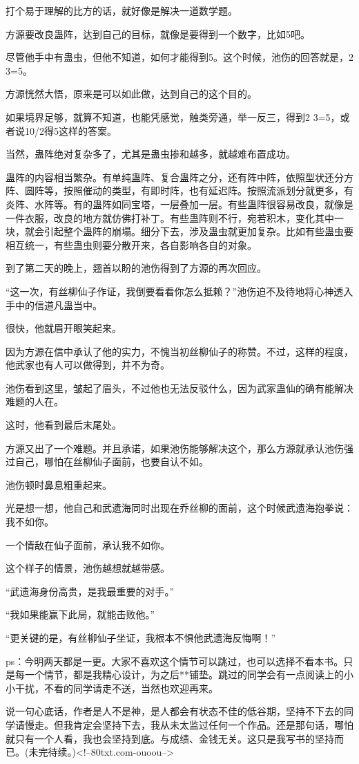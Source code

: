 \begin{this_body}
打个易于理解的比方的话，就好像是解决一道数学题。

方源要改良蛊阵，达到自己的目标，就像是要得到一个数字，比如5吧。

尽管他手中有蛊虫，但他不知道，如何才能得到5。这个时候，池伤的回答就是，2 3=5。

方源恍然大悟，原来是可以如此做，达到自己的这个目的。

如果境界足够，就算不知道，也能凭感觉，触类旁通，举一反三，得到2 3=5，或者说10/2得5这样的答案。

当然，蛊阵绝对复杂多了，尤其是蛊虫掺和越多，就越难布置成功。

蛊阵的内容相当繁杂。有单纯蛊阵、复合蛊阵之分，还有阵中阵，依照型状还分方阵、圆阵等，按照催动的类型，有即时阵，也有延迟阵。按照流派划分就更多，有炎阵、水阵等。有的蛊阵如同宝塔，一层叠加一层。有些蛊阵很容易改良，就像是一件衣服，改良的地方就仿佛打补丁。有些蛊阵则不行，宛若积木，变化其中一块，就会引起整个蛊阵的崩塌。细分下去，涉及蛊虫就更加复杂。比如有些蛊虫要相互统一，有些蛊虫则要分散开来，各自影响各自的对象。

到了第二天的晚上，翘首以盼的池伤得到了方源的再次回应。

“这一次，有丝柳仙子作证，我倒要看看你怎么抵赖？”池伤迫不及待地将心神透入手中的信道凡蛊当中。

很快，他就眉开眼笑起来。

因为方源在信中承认了他的实力，不愧当初丝柳仙子的称赞。不过，这样的程度，他武家也有人可以做得到，并不为奇。

池伤看到这里，皱起了眉头，不过他也无法反驳什么，因为武家蛊仙的确有能解决难题的人在。

这时，他看到最后末尾处。

方源又出了一个难题。并且承诺，如果池伤能够解决这个，那么方源就承认池伤强过自己，哪怕在丝柳仙子面前，也要自认不如。

池伤顿时鼻息粗重起来。

光是想一想，他自己和武遗海同时出现在乔丝柳的面前，这个时候武遗海抱拳说：我不如你。

一个情敌在仙子面前，承认我不如你。

这个样子的情景，池伤越想就越带感。

“武遗海身份高贵，是我最重要的对手。”

“我如果能赢下此局，就能击败他。”

“更关键的是，有丝柳仙子坐证，我根本不惧他武遗海反悔啊！”

ps：今明两天都是一更。大家不喜欢这个情节可以跳过，也可以选择不看本书。只是每一个情节，都是我精心设计，为之后**铺垫。跳过的同学会有一点阅读上的小小干扰，不看的同学请走不送，当然也欢迎再来。

说一句心底话，作者是人不是神，是人都会有状态不佳的低谷期，坚持不下去的同学请慢走。但我肯定会坚持下去，我从未太监过任何一个作品。还是那句话，哪怕就只有一个人看，我也会坚持到底。与成绩、金钱无关。这只是我写书的坚持而已。(未完待续。)<!--80txt.com-ouoou-->

\end{this_body}

